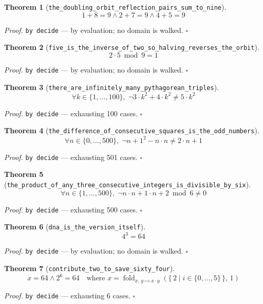 \documentclass[11pt]{article}
\newtheorem{theorem}{Theorem}[section]
\begin{document}
\begin{theorem}[\texttt{the\_doubling\_orbit\_reflection\_pairs\_sum\_to\_nine}]
\[ 1 + 8 = 9 \land 2 + 7 = 9 \land 4 + 5 = 9 \]
\end{theorem}
\noindent\emph{Proof.} \texttt{by decide} --- by evaluation; no domain is walked. \hfill$\square$

\begin{theorem}[\texttt{five\_is\_the\_inverse\_of\_two\_so\_halving\_reverses\_the\_orbit}]
\[ 2 \cdot 5 \bmod 9 = 1 \]
\end{theorem}
\noindent\emph{Proof.} \texttt{by decide} --- by evaluation; no domain is walked. \hfill$\square$

\begin{theorem}[\texttt{there\_are\_infinitely\_many\_pythagorean\_triples}]
\[ \forall k \in \{1,\dots,100\},\; \lnot 3 \cdot k^{2} + 4 \cdot k^{2} \neq 5 \cdot k^{2} \]
\end{theorem}
\noindent\emph{Proof.} \texttt{by decide} --- exhausting 100 cases. \hfill$\square$

\begin{theorem}[\texttt{the\_difference\_of\_consecutive\_squares\_is\_the\_odd\_numbers}]
\[ \forall n \in \{0,\dots,500\},\; \lnot n + 1^{2} - n \cdot n \neq 2 \cdot n + 1 \]
\end{theorem}
\noindent\emph{Proof.} \texttt{by decide} --- exhausting 501 cases. \hfill$\square$

\begin{theorem}[\texttt{the\_product\_of\_any\_three\_consecutive\_integers\_is\_divisible\_by\_six}]
\[ \forall n \in \{1,\dots,500\},\; \lnot n \cdot n + 1 \cdot n + 2 \bmod 6 \neq 0 \]
\end{theorem}
\noindent\emph{Proof.} \texttt{by decide} --- exhausting 500 cases. \hfill$\square$

\begin{theorem}[\texttt{dna\_is\_the\_version\_itself}]
\[ 4^{3} = 64 \]
\end{theorem}
\noindent\emph{Proof.} \texttt{by decide} --- by evaluation; no domain is walked. \hfill$\square$

\begin{theorem}[\texttt{contribute\_two\_to\_save\_sixty\_four}]
\[ x = 64 \land 2^{6} = 64 \quad \text{where } x = \operatorname{fold}_{x,\,y \mapsto x \cdot y}\left(\{\, 2 \mid i \in \{0,\dots,5\} \,\},\, 1\right) \]
\end{theorem}
\noindent\emph{Proof.} \texttt{by decide} --- exhausting 6 cases. \hfill$\square$
\end{document}
